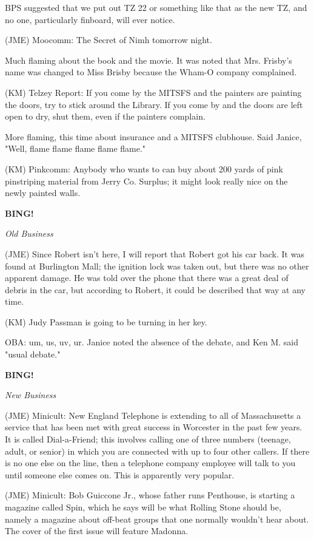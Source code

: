 \documentclass[12pt]{article}
\newcommand{\bing}{{\bf BING!} }
\newcommand{\goto}[1]{\bing \vskip 12pt \centerline{{\em{#1}}}}
\begin{document}
BPS suggested that we put out TZ 22 or something like that as the new TZ, and no one, particularly finboard, will ever notice.

(JME) Moocomm: The Secret of Nimh tomorrow night.

Much flaming about the book and the movie. It was noted that Mrs. Frisby's name was changed to Miss Brisby because the Wham-O company complained.

(KM) Telzey Report: If you come by the MITSFS and the painters are painting the doors, try to stick around the Library. If you come by and the doors are left open to dry, shut them, even if the painters complain.

More flaming, this time about insurance and a MITSFS clubhouse. Said Janice, "Well, flame flame flame flame flame."

(KM) Pinkcomm: Anybody who wants to can buy about 200 yards of pink pinstriping material from Jerry Co. Surplus; it might look really nice on the newly painted walls.

\goto{Old Business}

(JME) Since Robert isn't here, I will report that Robert got his car back. It was found at Burlington Mall; the ignition lock was taken out, but there was no other apparent damage. He was told over the phone that there was a great deal of debris in the car, but according to Robert, it could be described that way at any time.

(KM) Judy Passman is going to be turning in her key.

OBA: um, us, uv, ur. Janice noted the absence of the debate, and Ken M. said "usual debate."

\goto{New Business}

(JME) Minicult: New England Telephone is extending to all of Massachusetts a service that has been met with great success in Worcester in the past few years. It is called Dial-a-Friend; this involves calling one of three numbers (teenage, adult, or senior) in which you are connected with up to four other callers. If there is no one else on the line, then a telephone company employee will talk to you until someone else comes on. This is apparently very popular.

(JME) Minicult: Bob Guiccone Jr., whose father runs Penthouse, is starting a magazine called Spin, which he says will be what Rolling Stone should be, namely a magazine about off-beat groups that one normally wouldn't hear about. The cover of the first issue will feature Madonna.
\end{document}
